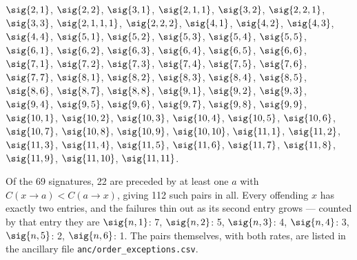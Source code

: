 \begingroup\small\noindent
\(\sig{2,1}\), \(\sig{2,2}\), \(\sig{3,1}\), \(\sig{2,1,1}\), \(\sig{3,2}\), \(\sig{2,2,1}\), \(\sig{3,3}\), \(\sig{2,1,1,1}\), \(\sig{2,2,2}\), \(\sig{4,1}\), \(\sig{4,2}\), \(\sig{4,3}\), \(\sig{4,4}\), \(\sig{5,1}\), \(\sig{5,2}\), \(\sig{5,3}\), \(\sig{5,4}\), \(\sig{5,5}\), \(\sig{6,1}\), \(\sig{6,2}\), \(\sig{6,3}\), \(\sig{6,4}\), \(\sig{6,5}\), \(\sig{6,6}\), \(\sig{7,1}\), \(\sig{7,2}\), \(\sig{7,3}\), \(\sig{7,4}\), \(\sig{7,5}\), \(\sig{7,6}\), \(\sig{7,7}\), \(\sig{8,1}\), \(\sig{8,2}\), \(\sig{8,3}\), \(\sig{8,4}\), \(\sig{8,5}\), \(\sig{8,6}\), \(\sig{8,7}\), \(\sig{8,8}\), \(\sig{9,1}\), \(\sig{9,2}\), \(\sig{9,3}\), \(\sig{9,4}\), \(\sig{9,5}\), \(\sig{9,6}\), \(\sig{9,7}\), \(\sig{9,8}\), \(\sig{9,9}\), \(\sig{10,1}\), \(\sig{10,2}\), \(\sig{10,3}\), \(\sig{10,4}\), \(\sig{10,5}\), \(\sig{10,6}\), \(\sig{10,7}\), \(\sig{10,8}\), \(\sig{10,9}\), \(\sig{10,10}\), \(\sig{11,1}\), \(\sig{11,2}\), \(\sig{11,3}\), \(\sig{11,4}\), \(\sig{11,5}\), \(\sig{11,6}\), \(\sig{11,7}\), \(\sig{11,8}\), \(\sig{11,9}\), \(\sig{11,10}\), \(\sig{11,11}\).
\endgroup

Of the 69 signatures, 22 are preceded by at least one \(a\) with \(C(x\to a)<C(a\to x)\), giving 112 such pairs in all.  Every offending \(x\) has exactly two entries, and the failures thin out as its second entry grows --- counted by that entry they are \(\sig{n,1}\): 7, \(\sig{n,2}\): 5, \(\sig{n,3}\): 4, \(\sig{n,4}\): 3, \(\sig{n,5}\): 2, \(\sig{n,6}\): 1.  The pairs themselves, with both rates, are listed in the ancillary file \texttt{anc/order\_exceptions.csv}.
